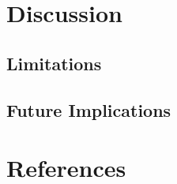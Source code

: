 \documentclass[
  english,
  ,doc, 12pt, a4paper,floatsintext]{apa7}
\begin{document}
\hypertarget{discussion}{%
\section{Discussion}\label{discussion}}

\hypertarget{limitations}{%
\subsection{Limitations}\label{limitations}}

\hypertarget{future-implications}{%
\subsection{Future Implications}\label{future-implications}}

\newpage

\hypertarget{references}{%
\section{References}\label{references}}

\begingroup
\setlength{\parindent}{-0.5in}
\setlength{\leftskip}{0.5in}
\end{document}
